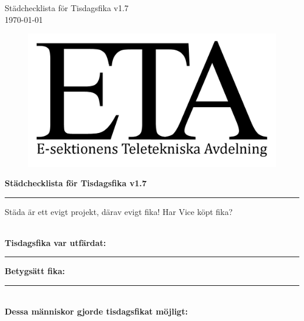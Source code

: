 \documentclass[a4paper, 12pt]{article}
\newcommand{\version}{v1.7} %
\newcommand{\titel}{Städchecklista för Tisdagsfika \version} %
\newcommand{\stadrad}{\makebox[\textwidth]{\hspace{5pt}\hrulefill\hspace{5pt}\hrulefill\hspace{5pt}\hrulefill\hspace{5pt}}}
\newcommand{\stadare}{\vspace{25pt} \stadrad}
\begin{document}
\titlespacing{\subsection}{0pt}{\parskip}{-\parskip}
\titlespacing{\subsubsection}{0pt}{\parskip}{-\parskip}

\flushright
\titel\\
\today

\flushleft

\begin{figure}[h]
    \includegraphics[scale = 2]{ETA-logga.png}
\end{figure}
{\LARGE \textbf{\titel}}         %
\newline
\noindent\rule{\textwidth}{1pt}                  %
Städa är ett evigt projekt, därav evigt fika! Har Vice köpt fika?

\\
\centering
\textbf{Tisdagsfika var utfärdat:}\rule{3cm}{1pt} \textbf{Betygsätt fika:}\rule{3cm}{1pt}\\
\vspace{5pt}
\textbf{Dessa människor gjorde tisdagsfikat möjligt:}\\

\stadare
\stadare
\stadare
\stadare
\stadare
\end{document}
